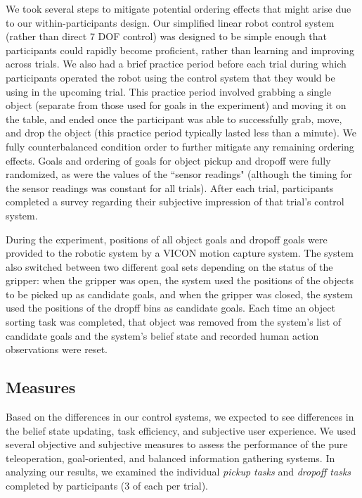\documentclass[conference]{IEEEtran}
\begin{document}
We took several steps to mitigate potential ordering effects that might arise due to our within-participants design. Our simplified linear robot control system (rather than direct 7 DOF control) was designed to be simple enough that participants could rapidly become proficient, rather than learning and improving across trials. We also had a brief practice period before each trial during which participants operated the robot using the control system that they would be using in the upcoming trial. This practice period involved grabbing a single object (separate from those used for goals in the experiment) and moving it on the table, and ended once the participant was able to successfully grab, move, and drop the object (this practice period typically lasted less than a minute). We fully counterbalanced condition order to further mitigate any remaining ordering effects. Goals and ordering of goals for object pickup and dropoff were fully randomized, as were the values of the ``sensor readings" (although the timing for the sensor readings was constant for all trials). After each trial, participants completed a survey regarding their subjective impression of that trial's control system. 

During the experiment, positions of all object goals and dropoff goals were provided to the robotic system by a VICON motion capture system. The system also switched between two different goal sets depending on the status of the gripper: when the gripper was open, the system used the positions of the objects to be picked up as candidate goals, and when the gripper was closed, the system used the positions of the dropff bins as candidate goals. Each time an object sorting task was completed, that object was removed from the system's list of candidate goals and the system's belief state and recorded human action observations were reset.

\subsection{Measures}

Based on the differences in our control systems, we expected to see differences in the belief state updating, task efficiency, and subjective user experience. We used several objective and subjective measures to assess the performance of the pure teleoperation, goal-oriented, and balanced information gathering systems. In analyzing our results, we examined the individual \textit{pickup tasks} and \textit{dropoff tasks} completed by participants (3 of each per trial).
\end{document}
